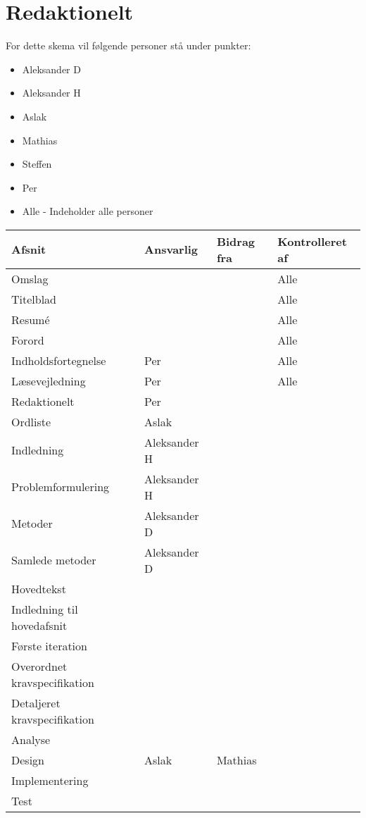 \chapter{Redaktionelt}
For dette skema vil følgende personer stå under punkter: 
\begin{itemize}
\item Aleksander D
\item Aleksander H
\item Aslak
\item Mathias
\item Steffen
\item Per
\item Alle - Indeholder alle personer 
\end{itemize}

\begin{center}
\begin{longtable}{|m{5cm}|m{4cm}|m{4cm}|m{3cm}|}
\hline
Afsnit & Ansvarlig & Bidrag fra & Kontrolleret af \\
\hline
Omslag & & & Alle\\
\hline
Titelblad & & & Alle\\
\hline
Resumé & & & Alle\\ \hline
Forord & & & Alle\\ \hline
Indholdsfortegnelse & Per & & Alle\\ \hline
Læsevejledning & Per & & Alle\\ \hline

Redaktionelt & Per & & \\ \hline
Ordliste & Aslak & & \\ \hline

Indledning & Aleksander H & & \\ \hline
Problemformulering & Aleksander H & & \\ \hline

Metoder & Aleksander D & & \\ \hline
Samlede metoder & Aleksander D & & \\ \hline

Hovedtekst & & & \\ \hline
Indledning til hovedafsnit & & & \\ \hline
Første iteration & & & \\ \hline
Overordnet kravspecifikation & & & \\ \hline
Detaljeret kravspecifikation & & & \\ \hline
Analyse & & & \\ \hline
Design & Aslak & Mathias & \\ \hline
Implementering & & & \\ \hline
Test & & & \\ \hline


\end{longtable}
\end{center}
